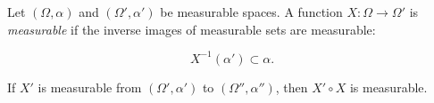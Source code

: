 Let $(\Omega, \alpha)$ and $(\Omega', \alpha')$ be measurable spaces. A function $X: \Omega \to \Omega'$ is \textit{measurable} if the inverse images of measurable sets are measurable:

$$X^{-1}(\alpha') \subset \alpha.$$

If $X'$ is measurable from $(\Omega', \alpha')$ to $(\Omega'', \alpha'')$, then $X' \circ X$ is measurable.
